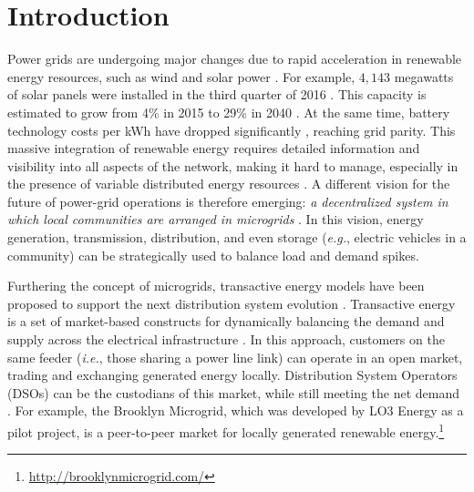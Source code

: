 \section{Introduction}


Power grids are undergoing major changes due to rapid
acceleration in renewable energy resources, such as wind and solar power \cite{5430489}. 
For example, $4,\!143$ megawatts of solar panels were installed in the
third quarter of 2016 \cite{seia}. This capacity is estimated to grow
from 4\% in 2015 to 29\% in 2040 \cite{Randal}. At the same time,
battery technology costs per kWh have dropped significantly
\cite{stock2015powerful}, reaching grid parity.
This massive integration of renewable energy requires detailed
information and visibility into all aspects of the network, making it
hard to manage, especially in the presence of variable distributed
energy resources \cite{7452738}. A different vision for the future of
power-grid operations is therefore emerging: {\em a decentralized
  system in which local communities are arranged in microgrids}
\cite{rahimi2012transactive}. In this vision, energy generation,
transmission, distribution, and even storage (\emph{e.g.}, electric
vehicles in a community) can be strategically used to balance load and
demand spikes.

Furthering the concept of microgrids, transactive energy models have
been proposed to support the next distribution system evolution
\cite{kok2016society,cox2013structured,melton2013gridwise}. Transactive
energy is a set of market-based constructs for dynamically balancing
the demand and supply across the electrical infrastructure
\cite{melton2013gridwise}. In this approach, customers on the same
feeder (\emph{i.e.}, those sharing a power line link) can operate in an
open market, trading and exchanging generated energy
locally. Distribution System Operators (DSOs) can be the custodians of
this market, while still meeting the net demand \cite{7462854}. For
example, the Brooklyn Microgrid, which was developed by LO3 Energy as
a pilot project, is a peer-to-peer market for locally generated
renewable energy.\footnote{\url{http://brooklynmicrogrid.com/}}


